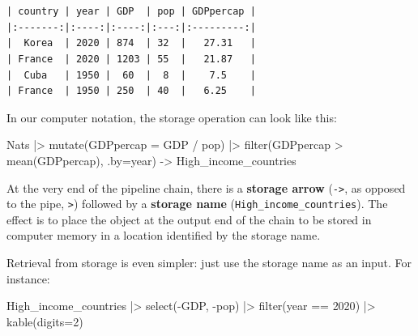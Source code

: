 \documentclass[
  letterpaper,
  DIV=11,
  numbers=noendperiod,
  oneside]{scrartcl}
\newenvironment{Shaded}{\begin{snugshade}}{\end{snugshade}}
\newcommand{\AttributeTok}[1]{\textcolor[rgb]{0.40,0.45,0.13}{#1}}
\newcommand{\DecValTok}[1]{\textcolor[rgb]{0.68,0.00,0.00}{#1}}
\newcommand{\FunctionTok}[1]{\textcolor[rgb]{0.28,0.35,0.67}{#1}}
\newcommand{\NormalTok}[1]{\textcolor[rgb]{0.00,0.23,0.31}{#1}}
\newcommand{\OtherTok}[1]{\textcolor[rgb]{0.00,0.23,0.31}{#1}}
\newcommand{\SpecialCharTok}[1]{\textcolor[rgb]{0.37,0.37,0.37}{#1}}
\begin{document}
\begin{verbatim}


| country | year | GDP  | pop | GDPpercap |
|:-------:|:----:|:----:|:---:|:---------:|
|  Korea  | 2020 | 874  | 32  |   27.31   |
| France  | 2020 | 1203 | 55  |   21.87   |
|  Cuba   | 1950 |  60  |  8  |    7.5    |
| France  | 1950 | 250  | 40  |   6.25    |
\end{verbatim}

In our computer notation, the storage operation can look like this:

\begin{Shaded}
\begin{Highlighting}[]
\NormalTok{Nats }\SpecialCharTok{|\textgreater{}}
  \FunctionTok{mutate}\NormalTok{(}\AttributeTok{GDPpercap =}\NormalTok{ GDP }\SpecialCharTok{/}\NormalTok{ pop) }\SpecialCharTok{|\textgreater{}}
  \FunctionTok{filter}\NormalTok{(GDPpercap }\SpecialCharTok{\textgreater{}} \FunctionTok{mean}\NormalTok{(GDPpercap), }\AttributeTok{.by=}\NormalTok{year) }\OtherTok{{-}\textgreater{}}\NormalTok{ High\_income\_countries}
\end{Highlighting}
\end{Shaded}

At the very end of the pipeline chain, there is a \textbf{storage arrow}
(\texttt{-\textgreater{}}, as opposed to the pipe,
\texttt{\textbar{}\textgreater{}}) followed by a \textbf{storage name}
(\texttt{High\_income\_countries}). The effect is to place the object at
the output end of the chain to be stored in computer memory in a
location identified by the storage name.

{}

Retrieval from storage is even simpler: just use the storage name as an
input. For instance:

\begin{Shaded}
\begin{Highlighting}[]
\NormalTok{High\_income\_countries }\SpecialCharTok{|\textgreater{}} 
  \FunctionTok{select}\NormalTok{(}\SpecialCharTok{{-}}\NormalTok{GDP, }\SpecialCharTok{{-}}\NormalTok{pop) }\SpecialCharTok{|\textgreater{}} 
  \FunctionTok{filter}\NormalTok{(year }\SpecialCharTok{==} \DecValTok{2020}\NormalTok{) }\SpecialCharTok{|\textgreater{}} 
  \FunctionTok{kable}\NormalTok{(}\AttributeTok{digits=}\DecValTok{2}\NormalTok{)}
\end{Highlighting}
\end{Shaded}
\end{document}
